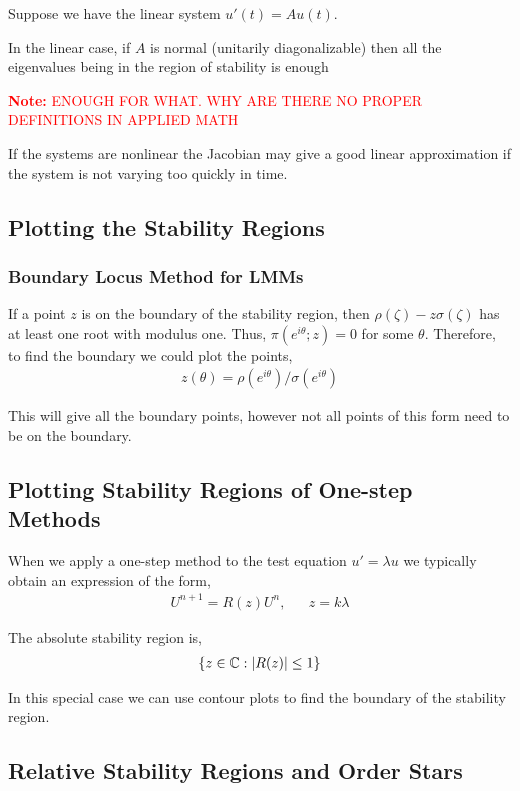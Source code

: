 \documentclass[12pt]{article}
\newcommand{\note}[1]{\textcolor{red}{\textbf{Note:} #1}}
\begin{document}
Suppose we have the linear system \( u'(t) = Au(t) \).

In the linear case, if \( A \) is normal (unitarily diagonalizable) then all the eigenvalues being in the region of stability is enough 

\note{ENOUGH FOR WHAT. WHY ARE THERE NO PROPER DEFINITIONS IN APPLIED MATH}

If the systems are nonlinear the Jacobian may give a good linear approximation if the system is not varying too quickly in time.

\subsection{Plotting the Stability Regions}

\subsubsection{Boundary Locus Method for LMMs}
If a point \( z \) is on the boundary of the stability region, then \( \rho(\zeta) - z\sigma(\zeta) \) has at least one root with modulus one. Thus, \( \pi(e^{i\theta};z) = 0 \) for some \( \theta \). Therefore, to find the boundary we could plot the points,
\begin{align*}
    z(\theta) = \rho(e^{i\theta})/\sigma(e^{i\theta})
\end{align*}

This will give all the boundary points, however not all points of this form need to be on the boundary.

\subsection{Plotting Stability Regions of One-step Methods}
When we apply a one-step method to the test equation \( u' = \lambda u \) we typically obtain an expression of the form,
\begin{align*}
    U^{n+1} = R(z) U^{n}, && z = k\lambda
\end{align*}

The absolute stability region is,
\begin{align*}
    \{z \in \mathbb{C} : |R(z)| \leq 1 \}
\end{align*}

In this special case we can use contour plots to find the boundary of the stability region.

\subsection{Relative Stability Regions and Order Stars}
\end{document}
